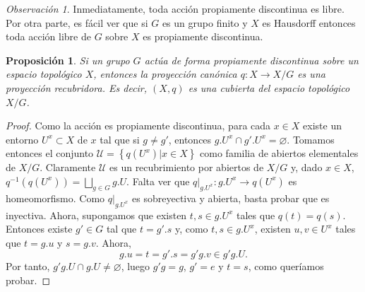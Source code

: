 \documentclass[12pt,a4paper]{book}
\newtheorem{prop}[thm]{Proposición}
\theoremstyle{definition} \newtheorem{defn}[thm]{Definición}
\theoremstyle{definition} \newtheorem{ejemplo}[thm]{Ejemplo}
\theoremstyle{definition} \newtheorem{ejercicio}[thm]{Ejercicio}
\theoremstyle{remark} \newtheorem*{obs}{Observación}
\begin{document}
\begin{obs}
  Inmediatamente, toda acción propiamente discontinua es libre. Por otra parte, es fácil ver que si $G$ es un grupo finito y $X$ es Hausdorff entonces toda acción libre de $G$ sobre $X$ es propiamente discontinua.
\end{obs}
\begin{prop}
  Si un grupo $G$ actúa de forma propiamente discontinua sobre un espacio topológico $X$, entonces la proyección canónica $q:X\rightarrow X/G$ es una proyección recubridora. Es decir, $(X,q)$ es una cubierta del espacio topológico $X/G$. 
\end{prop}
\begin{proof}
  Como la acción es propiamente discontinua, para cada $x\in X$ existe un entorno $U^x\subset X$ de $x$ tal que si $g\neq g'$, entonces $g.U^x\cap g'.U^x =\varnothing$. Tomamos entonces el conjunto $\mathcal{U}=\left\{q(U^x)|x\in X \right\}$ como familia de abiertos elementales de $X/G$. Claramente $\mathcal{U}$ es un recubrimiento por abiertos de $X/G$ y, dado $x\in X$, $q^{-1}(q(U^x))=\bigsqcup_{g\in G}g.U$. Falta ver que $q|_{g.U^x}:g.U^x\rightarrow q(U^x)$ es homeomorfismo. Como $q|_{g.U^x}$ es sobreyectiva y abierta, basta probar que es inyectiva. Ahora, supongamos que existen $t,s\in g.U^x$ tales que $q(t)=q(s)$. Entonces existe $g'\in G$ tal que $t= g'.s$ y, como $t,s\in g.U^x$, existen $u,v\in U^x$ tales que $t=g.u$ y $s=g.v$. Ahora,
  \begin{equation*}
    g.u=t=g'.s=g'g.v\in g'g.U.
  \end{equation*}
  Por tanto, $g'g.U\cap g.U\neq \varnothing$, luego $g'g=g$, $g'=e$ y $t=s$, como queríamos probar.
\end{proof}
\end{document}

